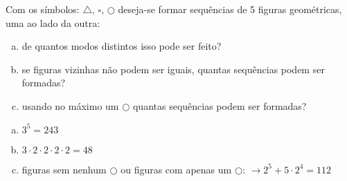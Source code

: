 \begin{ex}
Com os símbolos: \(\triangle\), \(\square\), \(\bigcirc \) deseja-se formar sequências de 5 figuras geométricas, uma ao lado da outra:
   \begin{enumerate}[(a)]
   \item de quantos modos distintos isso pode ser feito?
   \item se figuras vizinhas não podem ser iguais, quantas sequências podem ser formadas?
   \item usando no máximo um \(\bigcirc\) quantas sequências podem ser formadas?
   \end{enumerate}
     \begin{sol}
       \phantom{A}
        \begin{enumerate} [(a)]
            \item $3^5=243$
            \item $3\cdot2\cdot2\cdot2\cdot2=48$
            \item figuras sem nenhum \(\bigcirc\) ou figuras com apenas um \(\bigcirc\): $\rightarrow2^5+5\cdot2^4=112$
        \end{enumerate}
     \end{sol}
\end{ex}